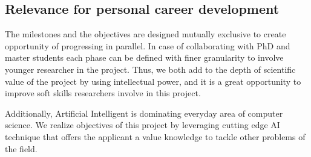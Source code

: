 \subsection{Relevance for personal career development }

The milestones and the objectives are designed  mutually exclusive to create opportunity of progressing in parallel. 
In case of collaborating with PhD and master students  each phase can be defined with finer granularity to involve younger researcher in the project. 
Thus, we both add to the depth of scientific value of the project by using intellectual power, and it is a great opportunity to improve soft skills researchers involve in this project.

Additionally, Artificial Intelligent is dominating everyday area of computer science.
We realize objectives of this project by leveraging cutting edge AI technique that offers the applicant a value knowledge to tackle other problems of the field. 